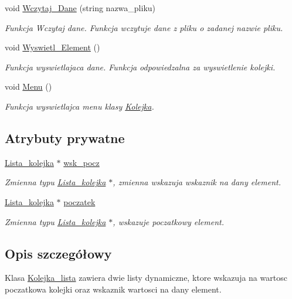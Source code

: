 \begin{DoxyCompactItemize}
void \hyperlink{class_kolejka__lista_a91633cddface592e92ae6725a3848d4c}{\-Wczytaj\-\_\-\-Dane} (string nazwa\-\_\-pliku)
\begin{DoxyCompactList}\small\item\em \-Funkcja \-Wczytaj dane. \-Funkcja wczytuje dane z pliku o zadanej nazwie pliku. \end{DoxyCompactList}\item 
void \hyperlink{class_kolejka__lista_aad962eba70726e11cea38db34176a9b4}{\-Wyswietl\-\_\-\-Element} ()
\begin{DoxyCompactList}\small\item\em \-Funkcja wyswietlajaca dane. \-Funkcja odpowiedzalna za wyswietlenie kolejki. \end{DoxyCompactList}\item 
void \hyperlink{class_kolejka__lista_a52acff2296e6341bb36fbacb722045b2}{\-Menu} ()
\begin{DoxyCompactList}\small\item\em \-Funkcja wyswietlajca menu klasy \hyperlink{class_kolejka}{\-Kolejka}. \end{DoxyCompactList}\end{DoxyCompactItemize}
\subsection*{\-Atrybuty prywatne}
\begin{DoxyCompactItemize}
\item 
\hyperlink{struct_lista__kolejka}{\-Lista\-\_\-kolejka} $\ast$ \hyperlink{class_kolejka__lista_aa0e11d9e192e2bfe47f9b9d0016622c7}{wsk\-\_\-pocz}
\begin{DoxyCompactList}\small\item\em \-Zmienna typu \hyperlink{struct_lista__kolejka}{\-Lista\-\_\-kolejka} $\ast$, zmienna wskazuja wskaznik na dany element. \end{DoxyCompactList}\item 
\hyperlink{struct_lista__kolejka}{\-Lista\-\_\-kolejka} $\ast$ \hyperlink{class_kolejka__lista_a45d5a866786a9a26a03be24e801ffb89}{poczatek}
\begin{DoxyCompactList}\small\item\em \-Zmienna typu \hyperlink{struct_lista__kolejka}{\-Lista\-\_\-kolejka} $\ast$, wskazuje poczatkowy element. \end{DoxyCompactList}\end{DoxyCompactItemize}


\subsection{\-Opis szczegółowy}
\-Klasa \hyperlink{class_kolejka__lista}{\-Kolejka\-\_\-lista} zawiera dwie listy dynamiczne, ktore wskazuja na wartosc poczatkowa kolejki oraz wskaznik wartosci na dany element. 

